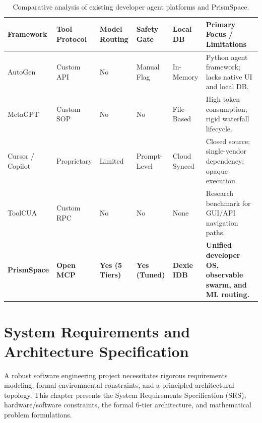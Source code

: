 \documentclass[12pt,a4paper]{report}
\begin{document}
\begin{table}[H]
\centering
\begin{singlespace}
\caption{Comparative analysis of existing developer agent platforms and PrismSpace.}
\label{tab:lit_comparison}
\footnotesize
\renewcommand{\arraystretch}{1.1}
\begin{tabularx}{\textwidth}{>{\raggedright\arraybackslash}p{2.3cm} >{\centering\arraybackslash}p{1.7cm} >{\centering\arraybackslash}p{1.7cm} >{\centering\arraybackslash}p{1.7cm} >{\centering\arraybackslash}p{1.6cm} >{\raggedright\arraybackslash}X}
\toprule
\textbf{Framework} & \textbf{Tool Protocol} & \textbf{Model Routing} & \textbf{Safety Gate} & \textbf{Local DB} & \textbf{Primary Focus / Limitations} \\
\midrule
AutoGen \cite{ref_autogen} & Custom API & No & Manual Flag & In-Memory & Python agent framework; lacks native UI and local DB. \\
MetaGPT \cite{ref_metagpt} & Custom SOP & No & No & File-Based & High token consumption; rigid waterfall lifecycle. \\
Cursor / Copilot & Proprietary & Limited & Prompt-Level & Cloud Synced & Closed source; single-vendor dependency; opaque execution. \\
ToolCUA \cite{ref_toolcua} & Custom RPC & No & No & None & Research benchmark for GUI/API navigation paths. \\
\textbf{PrismSpace} & \textbf{Open MCP} & \textbf{Yes (5 Tiers)} & \textbf{Yes (Tuned)} & \textbf{Dexie IDB} & \textbf{Unified developer OS, observable swarm, and ML routing.} \\
\bottomrule
\end{tabularx}
\end{singlespace}
\end{table}


\chapter{System Requirements and Architecture Specification}

A robust software engineering project necessitates rigorous requirements modeling, formal environmental constraints, and a principled architectural topology. This chapter presents the System Requirements Specification (SRS), hardware/software constraints, the formal 6-tier architecture, and mathematical problem formulations.
\end{document}
